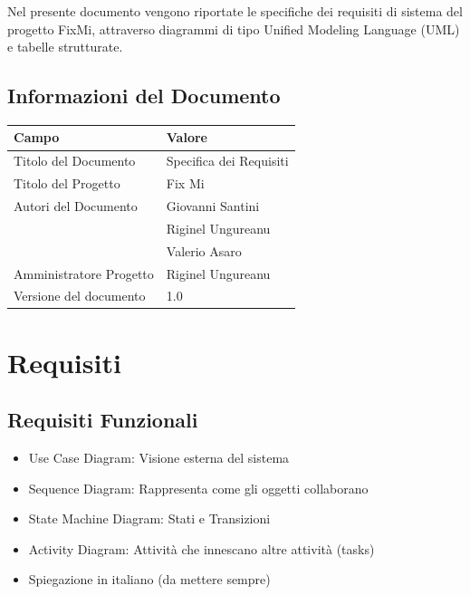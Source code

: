 \documentclass{report}
\begin{document}
	Nel presente documento vengono riportate le specifiche dei requisiti di sistema del progetto FixMi,  attraverso diagrammi di tipo Unified Modeling Language (UML) e tabelle strutturate.\\
	
	
	
	\section{Informazioni del Documento}
	
	\begin{center} %
		\centering
		\begin{tabular}{ |p{4cm}|p{4cm}|  }
			\hline
			\centering Campo & \qquad\qquad Valore \\ %
			\hline
			Titolo del Documento & Specifica dei Requisiti \\
			\hline
			Titolo del Progetto & Fix Mi \\
			\hline
			Autori del Documento &
			Giovanni Santini \\ & Riginel Ungureanu \\ & Valerio Asaro \\
			\hline
			Amministratore Progetto & Riginel Ungureanu\\
			\hline
			Versione del documento & 1.0 \\
			\hline
		\end{tabular}
	\end{center}


\chapter{Requisiti}

	
\section{Requisiti Funzionali}

\begin{itemize}
	\item Use Case Diagram: Visione esterna del sistema
	\item Sequence Diagram: Rappresenta come gli oggetti collaborano
	\item State Machine Diagram: Stati e Transizioni
	\item Activity Diagram: Attività che innescano altre attività (tasks)
	\item Spiegazione in italiano (da mettere sempre)
\end{itemize}
\end{document}
